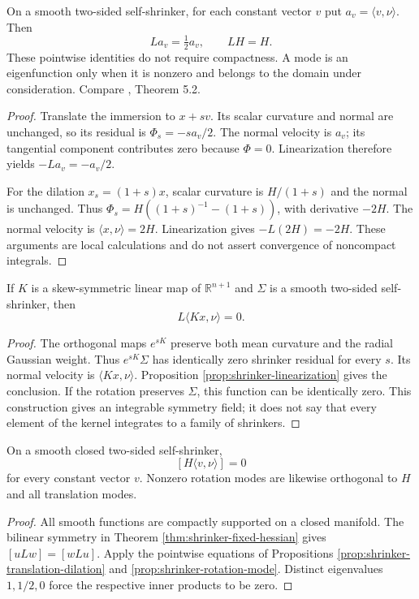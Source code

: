 \begin{proposition}\label{prop:shrinker-translation-dilation}
On a smooth two-sided self-shrinker, for each constant vector $v$ put $a_v=\langle v,\nu\rangle$. Then
\[
 La_v=\tfrac12a_v,\qquad LH=H.
\]
These pointwise identities do not require compactness. A mode is an eigenfunction only when it is nonzero and belongs to the domain under consideration. Compare \cite{CM12}, Theorem 5.2.
\end{proposition}
\begin{proof}
Translate the immersion to $x+sv$. Its scalar curvature and normal are unchanged, so its residual is $\Phi_s=-s a_v/2$. The normal velocity is $a_v$; its tangential component contributes zero because $\Phi=0$. Linearization therefore yields $-La_v=-a_v/2$.

For the dilation $x_s=(1+s)x$, scalar curvature is $H/(1+s)$ and the normal is unchanged. Thus $\Phi_s=H((1+s)^{-1}-(1+s))$, with derivative $-2H$. The normal velocity is $\langle x,\nu\rangle=2H$. Linearization gives $-L(2H)=-2H$. These arguments are local calculations and do not assert convergence of noncompact integrals.
\end{proof}

\begin{proposition}\label{prop:shrinker-rotation-mode}
If $K$ is a skew-symmetric linear map of $\mathbb R^{n+1}$ and $\Sigma$ is a smooth two-sided self-shrinker, then
\[
 L\langle Kx,\nu\rangle=0.
\]
\end{proposition}
\begin{proof}
The orthogonal maps $e^{sK}$ preserve both mean curvature and the radial Gaussian weight. Thus $e^{sK}\Sigma$ has identically zero shrinker residual for every $s$. Its normal velocity is $\langle Kx,\nu\rangle$. Proposition \ref{prop:shrinker-linearization} gives the conclusion. If the rotation preserves $\Sigma$, this function can be identically zero. This construction gives an integrable symmetry field; it does not say that every element of the kernel integrates to a family of shrinkers.
\end{proof}

\begin{corollary}\label{cor:shrinker-mode-orthogonality}
On a smooth closed two-sided self-shrinker,
\[
 [H\langle v,\nu\rangle]=0
\]
for every constant vector $v$. Nonzero rotation modes are likewise orthogonal to $H$ and all translation modes.
\end{corollary}
\begin{proof}
All smooth functions are compactly supported on a closed manifold. The bilinear symmetry in Theorem \ref{thm:shrinker-fixed-hessian} gives $[uLw]=[wLu]$. Apply the pointwise equations of Propositions \ref{prop:shrinker-translation-dilation} and \ref{prop:shrinker-rotation-mode}. Distinct eigenvalues $1,1/2,0$ force the respective inner products to be zero.
\end{proof}

